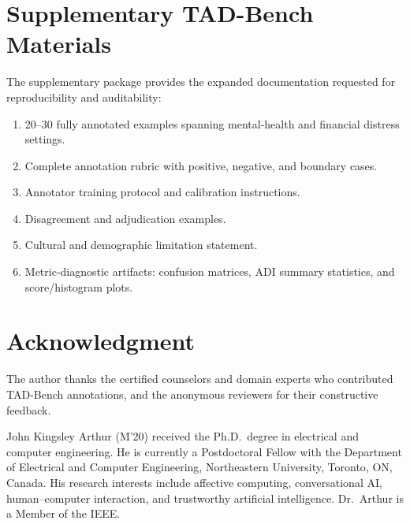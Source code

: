 \documentclass[lettersize,journal]{IEEEtran}
\begin{document}
\appendices
\section{Supplementary TAD-Bench Materials}

The supplementary package provides the expanded documentation requested for
reproducibility and auditability:
\begin{enumerate}
\item 20--30 fully annotated examples spanning mental-health and financial
distress settings.
\item Complete annotation rubric with positive, negative, and boundary cases.
\item Annotator training protocol and calibration instructions.
\item Disagreement and adjudication examples.
\item Cultural and demographic limitation statement.
\item Metric-diagnostic artifacts: confusion matrices, ADI summary statistics,
and score/histogram plots.
\end{enumerate}

\section*{Acknowledgment}

The author thanks the certified counselors and domain experts who contributed
TAD-Bench annotations, and the anonymous reviewers for their constructive
feedback.




\begin{IEEEbiographynophoto}{John Kingsley Arthur}
(M'20) received the Ph.D.\ degree in electrical and computer engineering.
He is currently a Postdoctoral Fellow with the Department of Electrical and
Computer Engineering, Northeastern University, Toronto, ON, Canada.
His research interests include affective computing, conversational AI,
human--computer interaction, and trustworthy artificial intelligence.
Dr.\ Arthur is a Member of the IEEE.
\end{IEEEbiographynophoto}
\end{document}
